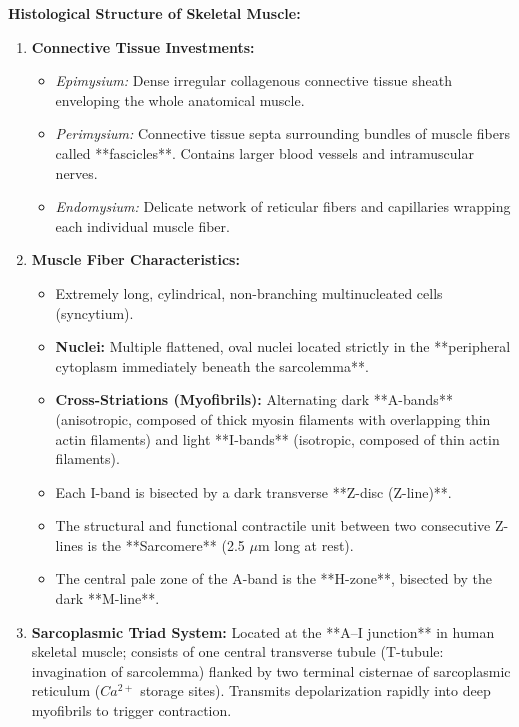 \documentclass[11pt,a4paper]{article}
\begin{document}
\begin{ansbox}
\textbf{Histological Structure of Skeletal Muscle:}
\begin{enumerate}[leftmargin=*]
    \item \textbf{Connective Tissue Investments:}
    \begin{itemize}
        \item \textit{Epimysium:} Dense irregular collagenous connective tissue sheath enveloping the whole anatomical muscle.
        \item \textit{Perimysium:} Connective tissue septa surrounding bundles of muscle fibers called **fascicles**. Contains larger blood vessels and intramuscular nerves.
        \item \textit{Endomysium:} Delicate network of reticular fibers and capillaries wrapping each individual muscle fiber.
    \end{itemize}
    \item \textbf{Muscle Fiber Characteristics:}
    \begin{itemize}
        \item Extremely long, cylindrical, non-branching multinucleated cells (syncytium).
        \item \textbf{Nuclei:} Multiple flattened, oval nuclei located strictly in the **peripheral cytoplasm immediately beneath the sarcolemma**.
        \item \textbf{Cross-Striations (Myofibrils):} Alternating dark **A-bands** (anisotropic, composed of thick myosin filaments with overlapping thin actin filaments) and light **I-bands** (isotropic, composed of thin actin filaments).
        \item Each I-band is bisected by a dark transverse **Z-disc (Z-line)**.
        \item The structural and functional contractile unit between two consecutive Z-lines is the **Sarcomere** (2.5 $\mu$m long at rest).
        \item The central pale zone of the A-band is the **H-zone**, bisected by the dark **M-line**.
    \end{itemize}
    \item \textbf{Sarcoplasmic Triad System:} Located at the **A--I junction** in human skeletal muscle; consists of one central transverse tubule (T-tubule: invagination of sarcolemma) flanked by two terminal cisternae of sarcoplasmic reticulum ($Ca^{2+}$ storage sites). Transmits depolarization rapidly into deep myofibrils to trigger contraction.
\end{enumerate}
\end{ansbox}
\end{document}
